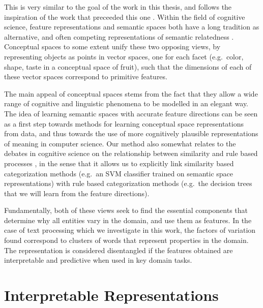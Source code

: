 This is very similar to the goal of the work in this thesis, and follows the inspiration of the work that preceeded this one \cite{Derrac2015}. Within the field of cognitive science, feature representations and semantic spaces both have a long tradition as alternative, and often competing representations of semantic relatedness \cite{tversky1977features}. Conceptual spaces \cite{gardenfors2004conceptual} to some extent unify these two opposing views, by representing objects as points in vector spaces, one for each facet (e.g.\ color, shape, taste in a conceptual space of fruit), such that the dimensions of each of these vector spaces correspond to primitive features. %

The main appeal of conceptual spaces stems from the fact that they allow a wide range of cognitive and linguistic phenomena to be modelled in an elegant way. The idea of learning semantic spaces with accurate feature directions can be seen as a first step towards methods for learning conceptual space representations from data, and thus towards the use of more cognitively plausible representations of meaning in computer science. Our method also somewhat relates to the debates in cognitive science on the relationship between similarity and rule based processes  \cite{HAHN1998197}, in the sense that it allows us to explicitly link similarity based categorization methods (e.g.\ an SVM classifier trained on semantic space representations) with rule based categorization methods (e.g.\ the decision trees that we will learn from the feature directions).

Fundamentally, both of these views seek to find the essential components that determine why all entities vary in the domain, and use them as features. In the case of text processing which we investigate in this work, the factors of variation found correspond to clusters of words that represent properties in the domain. The representation is considered disentangled if the features obtained are interpretable and  predictive when used in key domain tasks.


\section{Interpretable Representations}



